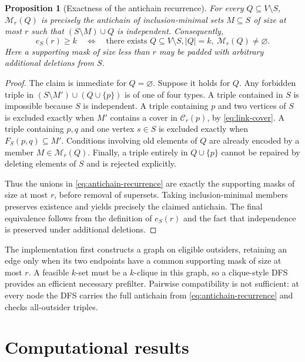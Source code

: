 \documentclass[11pt]{article}
\newtheorem{proposition}[theorem]{Proposition}
\theoremstyle{definition}
\theoremstyle{remark}
\newcommand{\calC}{\mathcal{C}}
\newcommand{\calM}{\mathcal{M}}
\begin{document}
\begin{proposition}[Exactness of the antichain recurrence]
\label{prop:antichain}
For every $Q\subseteq V\setminus S$, $\calM_r(Q)$ is precisely the antichain
of inclusion-minimal sets $M\subseteq S$ of size at most $r$ such that
$(S\setminus M)\cup Q$ is independent.  Consequently,
\[
 e_S(r)\ge k
 \quad\Longleftrightarrow\quad
 \text{there exists }Q\subseteq V\setminus S, |Q|=k,
 \ \calM_r(Q)\ne\varnothing.
\]
Here a supporting mask of size less than $r$ may be padded with arbitrary
additional deletions from $S$.
\end{proposition}

\begin{proof}
The claim is immediate for $Q=\varnothing$.  Suppose it holds for $Q$.
Any forbidden triple in $(S\setminus M')\cup(Q\cup\{p\})$ is of one of four
types.  A triple contained in $S$ is impossible because $S$ is independent.
A triple containing $p$ and two vertices of $S$ is excluded exactly when
$M'$ contains a cover in $\calC_r(p)$, by \eqref{eq:link-cover}.  A triple
containing $p,q$ and one vertex $s\in S$ is excluded exactly when
$F_S(p,q)\subseteq M'$.  Conditions involving old elements of $Q$ are already
encoded by a member $M\in\calM_r(Q)$.  Finally, a triple entirely in
$Q\cup\{p\}$ cannot be repaired by deleting elements of $S$ and is rejected
explicitly.

Thus the unions in \eqref{eq:antichain-recurrence} are exactly the supporting
masks of size at most $r$, before removal of supersets.  Taking
inclusion-minimal members preserves existence and yields precisely the claimed
antichain.  The final equivalence follows from the definition of $e_S(r)$ and
the fact that independence is preserved under additional deletions.
\end{proof}

The implementation first constructs a graph on eligible outsiders, retaining
an edge only when its two endpoints have a common supporting mask of size at
most $r$.  A feasible $k$-set must be a $k$-clique in this graph, so a
clique-style DFS provides an efficient necessary prefilter.  Pairwise
compatibility is not sufficient: at every node the DFS carries the full
antichain from \eqref{eq:antichain-recurrence} and checks all-outsider triples.

\section{Computational results}
\label{sec:results}
\end{document}
